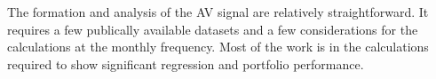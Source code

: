 The formation and analysis of the AV signal are relatively straightforward. It requires a few publically available datasets and a few considerations for the calculations at the monthly frequency. Most of the work is in the calculations required to show significant regression and portfolio performance. 